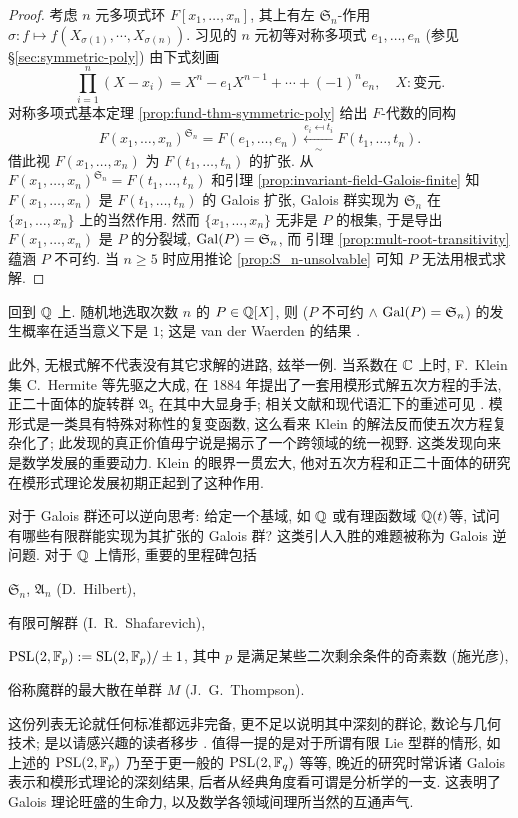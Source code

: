 \begin{proof}
	考虑 $n$ 元多项式环 $F[x_1, \ldots, x_n]$, 其上有左 $\mathfrak{S}_n$-作用 $\sigma: f \mapsto f(X_{\sigma(1)}, \cdots, X_{\sigma(n)})$. 习见的 $n$ 元初等对称多项式 $e_1, \ldots, e_n$ (参见 \S\ref{sec:symmetric-poly}) 由下式刻画
	\[ \prod_{i=1}^n (X - x_i) = X^n - e_1 X^{n-1} + \cdots + (-1)^n e_n, \quad X: \text{变元}. \]
	对称多项式基本定理 \ref{prop:fund-thm-symmetric-poly} 给出 $F$-代数的同构
	\[ F(x_1, \ldots, x_n)^{\mathfrak{S}_n} = F(e_1, \ldots, e_n) \xleftarrow[\sim]{e_i \mapsfrom t_i} F(t_1, \ldots, t_n). \]
	借此视 $F(x_1, \ldots, x_n)$ 为 $F(t_1, \ldots, t_n)$ 的扩张. 从 $F(x_1, \ldots, x_n)^{\mathfrak{S}_n} = F(t_1, \ldots, t_n)$ 和引理 \ref{prop:invariant-field-Galois-finite} 知 $F(x_1, \ldots, x_n)$ 是 $F(t_1, \ldots, t_n)$ 的 Galois 扩张, Galois 群实现为 $\mathfrak{S}_n$ 在 $\{x_1, \ldots, x_n\}$ 上的当然作用. 然而 $\{x_1, \ldots, x_n\}$ 无非是 $P$ 的根集, 于是导出 $F(x_1, \ldots, x_n)$ 是 $P$ 的分裂域, $\operatorname{Gal}(P) = \mathfrak{S}_n$, 而 引理 \ref{prop:mult-root-transitivity} 蕴涵 $P$ 不可约. 当 $n \geq 5$ 时应用推论 \ref{prop:S_n-unsolvable} 可知 $P$ 无法用根式求解.
\end{proof}

回到 $\mathbb{Q}$ 上. 随机地选取次数 $n$ 的 $P \in \mathbb{Q}[X]$, 则 ($P$ 不可约 \;$\wedge$\; $\operatorname{Gal}(P) = \mathfrak{S}_n$) 的发生概率在适当意义下是 $1$; 这是 van der Waerden 的结果 \cite{vdW34}.

此外, 无根式解不代表没有其它求解的进路, 兹举一例. 当系数在 $\mathbb{C}$ 上时, F.\ Klein 集 C.\ Hermite 等先驱之大成, 在 1884 年提出了一套用模形式解五次方程的手法, 正二十面体的旋转群 $\mathfrak{A}_5$ 在其中大显身手; 相关文献和现代语汇下的重述可见 \cite{Na14}. 模形式是一类具有特殊对称性的复变函数, 这么看来 Klein 的解法反而使五次方程复杂化了; 此发现的真正价值毋宁说是揭示了一个跨领域的统一视野. 这类发现向来是数学发展的重要动力. Klein 的眼界一贯宏大, 他对五次方程和正二十面体的研究在模形式理论发展初期正起到了这种作用.

对于 Galois 群还可以逆向思考: 给定一个基域, 如 $\mathbb{Q}$ 或有理函数域 $\mathbb{Q}(t)$等, 试问有哪些有限群能实现为其扩张的 Galois 群? 这类引人入胜的难题被称为 Galois 逆问题. 对于 $\mathbb{Q}$ 上情形, 重要的里程碑包括 
\begin{compactitem}
	\item $\mathfrak{S}_n$, $\mathfrak{A}_n$ (D.\ Hilbert),
	\item 有限可解群 (I.\ R.\ Shafarevich),
	\item $\text{PSL}(2, \mathbb{F}_p) := \operatorname{SL}(2, \mathbb{F}_p)/\pm 1$, 其中 $p$ 是满足某些二次剩余条件的奇素数 (施光彦),
	\item 俗称魔群的最大散在单群 $M$ (J.\ G.\ Thompson).
\end{compactitem}
这份列表无论就任何标准都远非完备, 更不足以说明其中深刻的群论, 数论与几何技术; 是以请感兴趣的读者移步 \cite{Ser08}. 值得一提的是对于所谓有限 Lie 型群的情形, 如上述的 $\text{PSL}(2, \mathbb{F}_p)$ 乃至于更一般的 $\text{PSL}(2, \mathbb{F}_q)$ 等等, 晚近的研究时常诉诸 Galois 表示和模形式理论的深刻结果, 后者从经典角度看可谓是分析学的一支. 这表明了 Galois 理论旺盛的生命力, 以及数学各领域间理所当然的互通声气.

